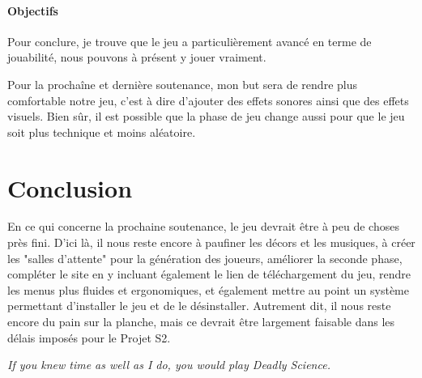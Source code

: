 \documentclass{article}
\begin{document}
\paragraph{Objectifs}

Pour conclure, je trouve que le jeu a particulièrement avancé en terme de jouabilité, nous pouvons à présent y jouer vraiment.

Pour la prochaîne et dernière soutenance, mon but sera de rendre plus comfortable notre jeu, c'est à dire d'ajouter des effets sonores ainsi que des effets visuels. Bien sûr, il est possible que la phase de jeu change aussi pour que le jeu soit plus technique et moins aléatoire. 





\newpage
\section{Conclusion}

En ce qui concerne la prochaine soutenance, le jeu devrait être à peu de choses près fini. D'ici là, il nous reste encore à paufiner les décors et les musiques, à créer les "salles d'attente" pour la génération des joueurs, améliorer la seconde phase, compléter le site en y incluant également le lien de téléchargement du jeu, rendre les menus plus fluides et ergonomiques, et également mettre au point un système permettant d'installer le jeu et de le désinstaller. Autrement dit, il nous reste encore du pain sur la planche, mais ce devrait être largement faisable dans les délais imposés pour le Projet S2.

\emph{If you knew time as well as I do, you would play Deadly Science.}

\end{document}
